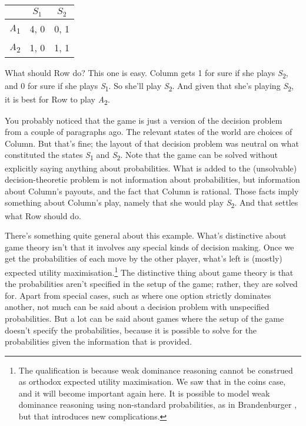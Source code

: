 \documentclass[
  11pt,
]{book}
\begin{document}
\begin{longtable}[]{@{}lcc@{}}
\toprule\noalign{}
& \(S_1\) & \(S_2\) \\
\midrule\noalign{}
\endhead
\bottomrule\noalign{}
\endlastfoot
\emph{A}\textsubscript{1} & 4, 0 & 0, 1 \\
\emph{A}\textsubscript{2} & 1, 0 & 1, 1 \\
\end{longtable}

What should Row do? This one is easy. Column gets 1 for sure if she plays \emph{S}\textsubscript{2}, and 0 for sure if she plays \emph{S}\textsubscript{1}. So she'll play \emph{S}\textsubscript{2}. And given that she's playing \emph{S}\textsubscript{2}, it is best for Row to play \emph{A}\textsubscript{2}.

You probably noticed that the game is just a version of the decision problem from a couple of paragraphs ago. The relevant states of the world are choices of Column. But that's fine; the layout of that decision problem was neutral on what constituted the states \emph{S}\textsubscript{1} and \emph{S}\textsubscript{2}. Note that the game can be solved without explicitly saying anything about probabilities. What is added to the (unsolvable) decision-theoretic problem is not information about probabilities, but information about Column's payouts, and the fact that Column is rational. Those facts imply something about Column's play, namely that she would play \emph{S}\textsubscript{2}. And that settles what Row should do.

There's something quite general about this example. What's distinctive about game theory isn't that it involves any special kinds of decision making. Once we get the probabilities of each move by the other player, what's left is (mostly) expected utility maximisation.\footnote{The qualification is because weak dominance reasoning cannot be construed as orthodox expected utility maximisation. We saw that in the coins case, and it will become important again here. It is possible to model weak dominance reasoning using non-standard probabilities, as in Brandenburger \citeyearpar{Brandenburger2008}, but that introduces new complications.} The distinctive thing about game theory is that the probabilities aren't specified in the setup of the game; rather, they are solved for. Apart from special cases, such as where one option strictly dominates another, not much can be said about a decision problem with unspecified probabilities. But a lot can be said about games where the setup of the game doesn't specify the probabilities, because it is possible to solve for the probabilities given the information that is provided.
\end{document}
